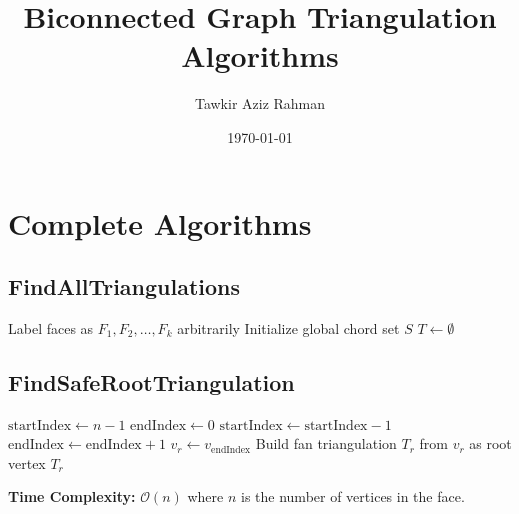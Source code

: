 \documentclass[12pt]{article}
\title{Biconnected Graph Triangulation Algorithms}
\author{Tawkir Aziz Rahman}
\date{\today}
\begin{document}
\maketitle

\section*{Complete Algorithms}

\subsection*{FindAllTriangulations}
\begin{algorithm}[H]
	\caption{FindAllTriangulations}
	\begin{algorithmic}[1]
		\State Label faces as $F_1, F_2, \ldots, F_k$ arbitrarily
		\State Initialize global chord set $S$
		\State $T \gets \emptyset$ 
		\State {}
		\EndProcedure
	\end{algorithmic}
\end{algorithm}

\subsection*{FindSafeRootTriangulation}
\begin{algorithm}[H]
	\caption{FindSafeRootTriangulation}
	\begin{algorithmic}[1]
		\State $\text{startIndex} \gets n - 1$
		\State $\text{endIndex} \gets 0$
		\State $\text{startIndex} \gets \text{startIndex} - 1$
		\Else
		\State $\text{endIndex} \gets \text{endIndex} + 1$
		\EndIf
		\EndWhile
		\State $v_r \gets v_{\text{endIndex}}$ 
		\State Build fan triangulation $T_r$ from $v_r$ as root vertex
		\State \Return $T_r$
		\EndProcedure
	\end{algorithmic}
\end{algorithm}

\textbf{Time Complexity:} $\mathcal{O}(n)$ where $n$ is the number of vertices in the face.
\end{document}

